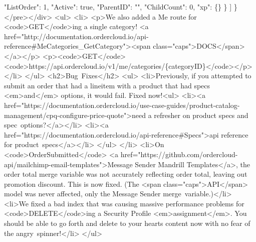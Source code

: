 \documentclass{memoir}%
\begin{document}
      "ListOrder": 1,\newline%
      "Active": true,\newline%
      "ParentID": "",\newline%
      "ChildCount": 0,\newline%
      "xp": \{\}\newline%
    \}\newline%
  {]}\newline%
\}\newline%
</pre></div>\newline%
<ul>\newline%
<li>\newline%
<p>We also added a Me route for <code>GET</code>ing a single category! <a href="http://documentation.ordercloud.io/api{-}reference\#MeCategories\_GetCategory"><span class="caps">DOCS</span></a></p>\newline%
<p><code>GET</code> <code>https://api.ordercloud.io/v1/me/categories/\{categoryID\}</code></p>\newline%
</li>\newline%
</ul>\newline%
<h2>Bug~Fixes</h2>\newline%
<ul>\newline%
<li>Previously, if you attempted to submit an order that had a lineitem with a product that had specs <em>and</em> options, it would fail. Fixed now!<ul>\newline%
<li><a href="https://documentation.ordercloud.io/use{-}case{-}guides/product{-}catalog{-}management/cpq{-}configure{-}price{-}quote">need a refresher on product specs and spec~options?</a></li>\newline%
<li><a href="https://documentation.ordercloud.io/api{-}reference\#Specs">api reference for product~specs</a></li>\newline%
</ul>\newline%
</li>\newline%
<li>On <code>OrderSubmitted</code> <a href="https://github.com/ordercloud{-}api/mailchimp{-}email{-}templates">Message Sender Mandrill Templates</a>, the order total merge variable was not accurately reflecting order total, leaving out promotion discount. This is now fixed. (The <span class="caps">API</span> model was never affected, only the Message Sender merge~variable.)</li>\newline%
<li>We fixed a bad index that was causing massive performance problems for <code>DELETE</code>ing a Security Profile <em>assignment</em>. You should be able to go forth and delete to your hearts content now with no fear of the angry~spinner!</li>\newline%
</ul>
\end{document}
